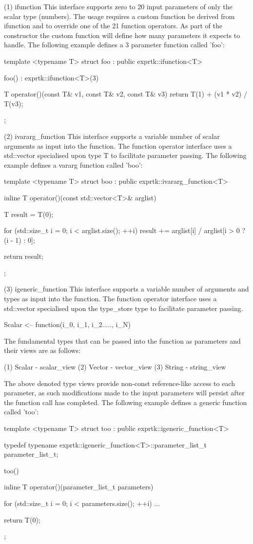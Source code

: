 (1) ifunction
This interface supports zero to 20 input parameters of only the scalar
type (numbers). The  usage requires a custom function be  derived from
ifunction and to override one of the 21 function operators. As part of
the constructor the custom function will define how many parameters it
expects  to  handle.  The  following  example  defines  a  3 parameter
function called 'foo':

template <typename T>
struct foo : public exprtk::ifunction<T>
{
foo() : exprtk::ifunction<T>(3)
{}

T operator()(const T\& v1, const T\& v2, const T\& v3)
{
	return T(1) + (v1 * v2) / T(v3);
}
};


(2) ivararg\_function
This interface supports a variable number of scalar arguments as input
into the function. The function operator interface uses a  std::vector
specialised upon type T to facilitate parameter passing. The following
example defines a vararg function called 'boo':

template <typename T>
struct boo : public exprtk::ivararg\_function<T>
{
inline T operator()(const std::vector<T>\& arglist)
{
	T result = T(0);
	
	for (std::size\_t i = 0; i < arglist.size(); ++i)
	{
		result += arglist[i] / arglist[i > 0 ? (i - 1) : 0];
	}
	
	return result;
}
};


(3) igeneric\_function
This interface supports  a variable number  of arguments and  types as
input  into  the  function. The  function  operator  interface uses  a
std::vector  specialised  upon  the  type\_store  type  to   facilitate
parameter passing.

Scalar <-- function(i\_0, i\_1, i\_2....., i\_N)


The  fundamental  types  that  can  be  passed  into  the  function as
parameters and their views are as follows:

(1) Scalar - scalar\_view
(2) Vector - vector\_view
(3) String - string\_view


The above denoted type  views provide non-const reference-like  access
to each parameter, as such modifications made to the input  parameters
will  persist after  the function  call has  completed. The  following
example defines a generic function called 'too':

template <typename T>
struct too : public exprtk::igeneric\_function<T>
{
typedef typename exprtk::igeneric\_function<T>::parameter\_list\_t
parameter\_list\_t;

too()
{}

inline T operator()(parameter\_list\_t parameters)
{
	for (std::size\_t i = 0; i < parameters.size(); ++i)
	{
		...
	}
	
	return T(0);
}
};


